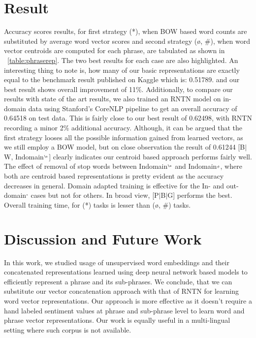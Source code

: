\section{Result}
Accuracy scores results, for first strategy (*), when BOW based word counts are substituted by average word vector scores and second strategy (\o , \#), when word vector centroids are computed for each phrase, are tabulated as shown in ~\autoref{table:phraserep}. The two best results for each case are also highlighted. An interesting thing to note is, how many of our basic representations are exactly equal to the benchmark result\footnotemark {} published on Kaggle which is: 0.51789. and our best result shows overall improvement of 11\%. Additionally, to compare our results with state of the art results, we also trained an RNTN model on in-domain data using Stanford's CoreNLP pipeline \parencite{CoreNLP:2014} to get an overall accuracy of 0.64518 on test data. This is fairly close to our best result of 0.62498, with RNTN recording a minor 2\% additional accuracy. Although, it can be argued that the first strategy looses all the possible information gained from learned vectors, as we still employ a BOW model, but on close observation the result of 0.61244 [B$|$W, Indomain$^{_{\o}}$] clearly indicates our centroid based approach performs fairly well. The effect of removal of stop words between Indomain$^{_{\o}}$ and Indomain$^{_{\#}}$, where both are centroid based representations is pretty evident as the accuracy decreases in general. Domain adapted training is effective for the In- and out-domain$^{_{*}}$ cases but not for others. In broad view, [P$|$B$|$G] performs the best. Overall training time, for (*) tasks is lesser than (\o , \#) tasks.

\section{Discussion and Future Work}
In this work, we studied usage of unsupervised word embeddings and their concatenated representations learned using deep neural network based models to efficiently represent a phrase and its sub-phrases. We conclude, that we can substitute our vector concatenation approach with that of RNTN for learning word vector representations. Our approach is more effective as it doesn't require a hand labeled sentiment values at phrase and sub-phrase level to learn word and phrase vector representations. Our work is equally useful in a multi-lingual setting where such corpus is not available. 

